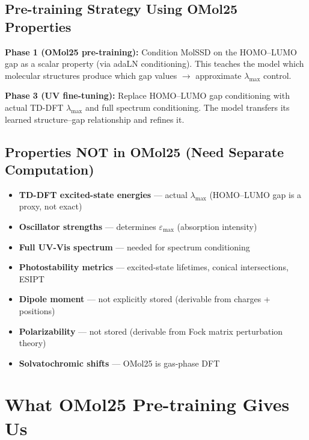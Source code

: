 \documentclass[11pt,a4paper]{article}
\begin{document}
\subsection{Pre-training Strategy Using OMol25 Properties}

\textbf{Phase 1 (OMol25 pre-training):} Condition MolSSD on the HOMO--LUMO gap
as a scalar property (via adaLN conditioning). This teaches the model which
molecular structures produce which gap values $\to$ approximate $\lambda_\text{max}$
control.

\textbf{Phase 3 (UV fine-tuning):} Replace HOMO--LUMO gap conditioning with
actual TD-DFT $\lambda_\text{max}$ and full spectrum conditioning. The model
transfers its learned structure--gap relationship and refines it.

\subsection{Properties NOT in OMol25 (Need Separate Computation)}

\begin{itemize}[nosep]
    \item \textbf{TD-DFT excited-state energies} --- actual $\lambda_\text{max}$
          (HOMO--LUMO gap is a proxy, not exact)
    \item \textbf{Oscillator strengths} --- determines $\varepsilon_\text{max}$
          (absorption intensity)
    \item \textbf{Full UV-Vis spectrum} --- needed for spectrum conditioning
    \item \textbf{Photostability metrics} --- excited-state lifetimes,
          conical intersections, ESIPT
    \item \textbf{Dipole moment} --- not explicitly stored (derivable from
          charges + positions)
    \item \textbf{Polarizability} --- not stored (derivable from Fock matrix
          perturbation theory)
    \item \textbf{Solvatochromic shifts} --- OMol25 is gas-phase DFT
\end{itemize}

\section{What OMol25 Pre-training Gives Us}
\end{document}
